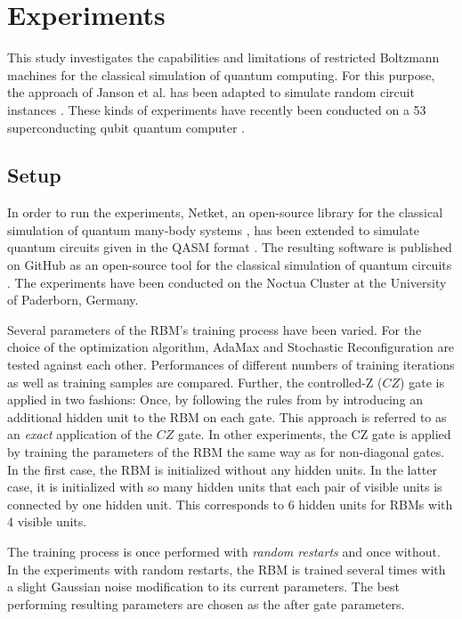 \chapter{Experiments}
\label{sec:experiments}

This study investigates the capabilities and limitations of restricted Boltzmann machines
for the classical simulation of quantum computing. For this purpose, the approach of Janson 
et al. \cite{jnsson2018neuralnetwork} has been adapted to simulate random circuit instances \cite{Boixo2018supremacy}.
These kinds of experiments have recently been conducted on a 53 superconducting qubit quantum computer \cite{martines2019supremacy}.

\section{Setup}
\label{sec:setup}

In order to run the experiments, Netket, an open-source library for the classical simulation of quantum 
many-body systems \cite{netket2019}, has been extended to simulate quantum circuits given in the QASM format \cite{cross2017open}. The resulting 
software is published on GitHub as an open-source tool for the classical simulation 
of quantum circuits \cite{NQS2020}. The experiments have been conducted on the Noctua Cluster at the University of Paderborn, Germany.

Several parameters of the RBM's training process have been varied. For the choice of the optimization algorithm, AdaMax and 
Stochastic Reconfiguration are tested against each other. Performances of different numbers of training iterations 
as well as training samples are compared. Further, the controlled-Z ($CZ$) gate is applied in two fashions: Once, 
by following the rules from \cite{jnsson2018neuralnetwork} by introducing an additional hidden unit to the RBM on each gate. 
This approach is referred to as an \textit{exact} application of the $CZ$ gate. In other 
experiments, the CZ gate is applied by training the parameters of the RBM the same way as for 
non-diagonal gates. In the first case, the RBM is initialized without any hidden units. In the latter 
case, it is initialized with so many hidden units that each pair of visible units is connected 
by one hidden unit. This corresponds to 6 hidden units for RBMs with 4 visible units.

The training process is once performed with \textit{random restarts} and once without. 
In the experiments with random restarts, the RBM is trained several times with a slight Gaussian noise modification to its 
current parameters. The best performing resulting parameters are chosen as the after gate parameters. 

